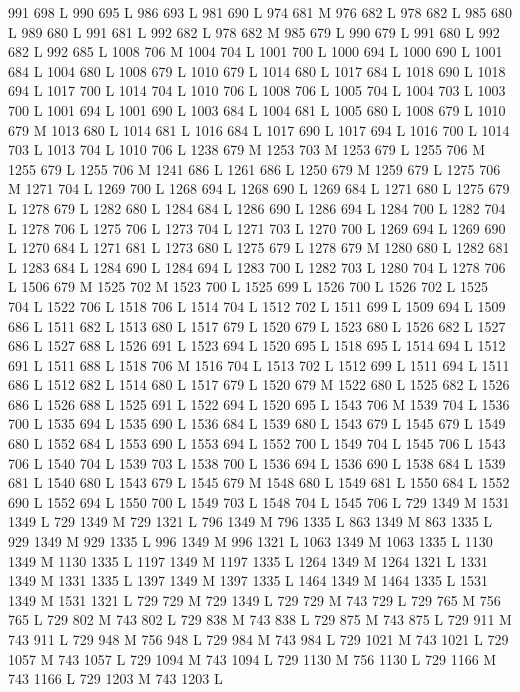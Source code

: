 {{{{{{{{{{{{{{{{{{{{{{{{{{{{{{991 698 L
990 695 L
986 693 L
981 690 L
974 681 M 976 682 L
978 682 L
985 680 L
989 680 L
991 681 L
992 682 L
978 682 M 985 679 L
990 679 L
991 680 L
992 682 L
992 685 L
1008 706 M 1004 704 L
1001 700 L
1000 694 L
1000 690 L
1001 684 L
1004 680 L
1008 679 L
1010 679 L
1014 680 L
1017 684 L
1018 690 L
1018 694 L
1017 700 L
1014 704 L
1010 706 L
1008 706 L
1005 704 L
1004 703 L
1003 700 L
1001 694 L
1001 690 L
1003 684 L
1004 681 L
1005 680 L
1008 679 L
1010 679 M 1013 680 L
1014 681 L
1016 684 L
1017 690 L
1017 694 L
1016 700 L
1014 703 L
1013 704 L
1010 706 L
1238 679 M 1253 703 M 1253 679 L
1255 706 M 1255 679 L
1255 706 M 1241 686 L
1261 686 L
1250 679 M 1259 679 L
1275 706 M 1271 704 L
1269 700 L
1268 694 L
1268 690 L
1269 684 L
1271 680 L
1275 679 L
1278 679 L
1282 680 L
1284 684 L
1286 690 L
1286 694 L
1284 700 L
1282 704 L
1278 706 L
1275 706 L
1273 704 L
1271 703 L
1270 700 L
1269 694 L
1269 690 L
1270 684 L
1271 681 L
1273 680 L
1275 679 L
1278 679 M 1280 680 L
1282 681 L
1283 684 L
1284 690 L
1284 694 L
1283 700 L
1282 703 L
1280 704 L
1278 706 L
1506 679 M 1525 702 M 1523 700 L
1525 699 L
1526 700 L
1526 702 L
1525 704 L
1522 706 L
1518 706 L
1514 704 L
1512 702 L
1511 699 L
1509 694 L
1509 686 L
1511 682 L
1513 680 L
1517 679 L
1520 679 L
1523 680 L
1526 682 L
1527 686 L
1527 688 L
1526 691 L
1523 694 L
1520 695 L
1518 695 L
1514 694 L
1512 691 L
1511 688 L
1518 706 M 1516 704 L
1513 702 L
1512 699 L
1511 694 L
1511 686 L
1512 682 L
1514 680 L
1517 679 L
1520 679 M 1522 680 L
1525 682 L
1526 686 L
1526 688 L
1525 691 L
1522 694 L
1520 695 L
1543 706 M 1539 704 L
1536 700 L
1535 694 L
1535 690 L
1536 684 L
1539 680 L
1543 679 L
1545 679 L
1549 680 L
1552 684 L
1553 690 L
1553 694 L
1552 700 L
1549 704 L
1545 706 L
1543 706 L
1540 704 L
1539 703 L
1538 700 L
1536 694 L
1536 690 L
1538 684 L
1539 681 L
1540 680 L
1543 679 L
1545 679 M 1548 680 L
1549 681 L
1550 684 L
1552 690 L
1552 694 L
1550 700 L
1549 703 L
1548 704 L
1545 706 L
729 1349 M 1531 1349 L
729 1349 M 729 1321 L
796 1349 M 796 1335 L
863 1349 M 863 1335 L
929 1349 M 929 1335 L
996 1349 M 996 1321 L
1063 1349 M 1063 1335 L
1130 1349 M 1130 1335 L
1197 1349 M 1197 1335 L
1264 1349 M 1264 1321 L
1331 1349 M 1331 1335 L
1397 1349 M 1397 1335 L
1464 1349 M 1464 1335 L
1531 1349 M 1531 1321 L
729 729 M 729 1349 L
729 729 M 743 729 L
729 765 M 756 765 L
729 802 M 743 802 L
729 838 M 743 838 L
729 875 M 743 875 L
729 911 M 743 911 L
729 948 M 756 948 L
729 984 M 743 984 L
729 1021 M 743 1021 L
729 1057 M 743 1057 L
729 1094 M 743 1094 L
729 1130 M 756 1130 L
729 1166 M 743 1166 L
729 1203 M 743 1203 L
}}}}}}}}}}}}}}}}}}}}}}}}}}}}}}
